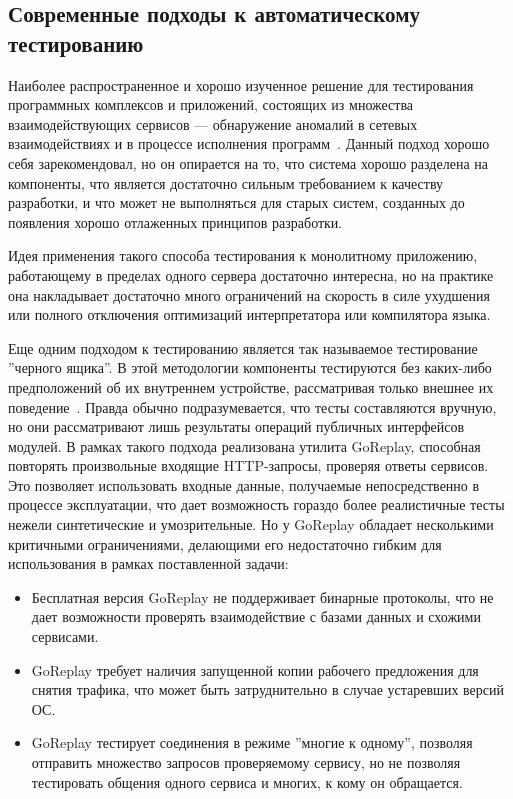 \subsection{Современные подходы к автоматическому тестированию}
Наиболее распространенное и хорошо изученное решение для тестирования
программных комплексов и приложений, состоящих из множества взаимодействующих
сервисов --- обнаружение аномалий в сетевых взаимодействиях и в процессе
исполнения программ~\cite{bohmer}. Данный подход хорошо себя зарекомендовал, но
он опирается на то, что система хорошо разделена на компоненты, что является
достаточно сильным требованием к качеству разработки, и что может не выполняться
для старых систем, созданных до появления хорошо отлаженных принципов разработки.

Идея применения такого способа тестирования к монолитному приложению,
работающему в пределах одного сервера достаточно интересна, но на практике она
накладывает достаточно много ограничений на скорость в силе ухудшения или
полного отключения оптимизаций интерпретатора или компилятора языка.

Еще одним подходом к тестированию является так называемое тестирование ''черного
ящика''. В этой методологии компоненты тестируются без каких-либо предположений
об их внутреннем устройстве, рассматривая только внешнее их
поведение~\cite{ahmed}. Правда обычно подразумевается, что тесты составляются
вручную, но они рассматривают лишь результаты операций публичных интерфейсов
модулей. В рамках такого подхода реализована утилита GoReplay, способная
повторять произвольные входящие HTTP-запросы, проверяя ответы сервисов. Это
позволяет использовать входные данные, получаемые непосредственно в процессе
эксплуатации, что дает возможность гораздо более реалистичные тесты нежели
синтетические и умозрительные. Но у GoReplay обладает несколькими критичными
ограничениями, делающими его недостаточно гибким для использования в рамках
поставленной задачи:
\begin{itemize}
    \item Бесплатная версия GoReplay не поддерживает бинарные протоколы, что не
дает возможности проверять взаимодействие с базами данных и схожими сервисами.  
    \item GoReplay требует наличия запущенной копии рабочего предложения для
снятия трафика, что может быть затруднительно в случае устаревших версий ОС.  
    \item GoReplay тестирует соединения в режиме ''многие к одному'', позволяя
отправить множество запросов проверяемому сервису, но не позволяя тестировать
общения одного сервиса и многих, к кому он обращается.  
\end{itemize}

